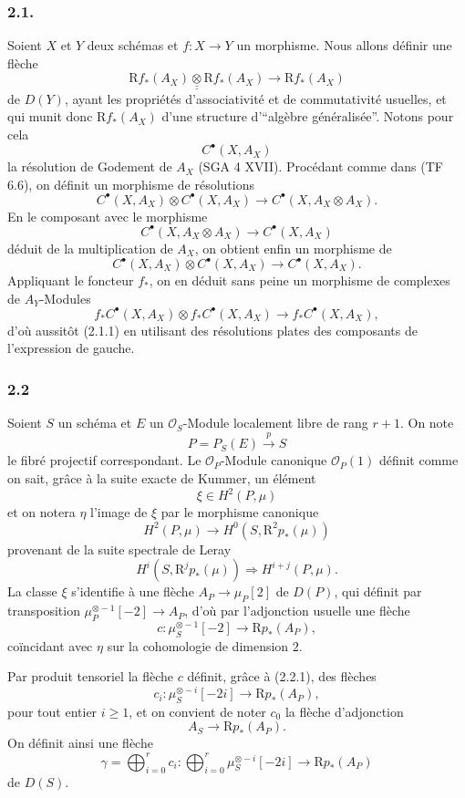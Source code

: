 \documentclass[11pt]{article}
\newcommand{\R}{\mathrm{R}}\newcommand{\RHomCore}{\mathrm{RHom}}
\providecommand{\R}{\mathrm R}
\begin{document}
\subsubsection*{2.1.}
Soient $X$ et $Y$ deux schémas et $f:X\to Y$ un morphisme. Nous allons définir une flèche
\[
\R f_*(A_X)\mathbin{\underline{\underline{\otimes}}} \R f_*(A_X)\longrightarrow \R f_*(A_X)
\tag{2.1.1}
\]
de $D(Y)$, ayant les propriétés d'associativité et de commutativité usuelles, et qui munit donc $\R f_*(A_X)$ d'une structure d'``algèbre généralisée''. Notons pour cela
\[
C^{\bullet}(X,A_X)
\]
la
résolution de Godement de $A_X$ (SGA 4 XVII). Procédant comme dans (TF 6.6), on définit un morphisme de résolutions
\[
C^{\bullet}(X,A_X)\otimes C^{\bullet}(X,A_X)\longrightarrow C^{\bullet}(X,A_X\otimes A_X).
\]
En le composant avec le morphisme
\[
C^{\bullet}(X,A_X\otimes A_X)\longrightarrow C^{\bullet}(X,A_X)
\]
déduit de la multiplication de $A_X$, on obtient enfin un morphisme de
\[
C^{\bullet}(X,A_X)\otimes C^{\bullet}(X,A_X)\longrightarrow C^{\bullet}(X,A_X).
\tag{2.1.2}
\]
Appliquant le foncteur $f_*$, on en déduit sans peine un morphisme de complexes de $A_Y$-Modules
\[
f_*C^{\bullet}(X,A_X)\otimes f_*C^{\bullet}(X,A_X)\longrightarrow f_*C^{\bullet}(X,A_X),
\]
d'où aussitôt (2.1.1) en utilisant des résolutions plates des composants de l'expression de gauche.

\subsubsection*{2.2}
Soient $S$ un schéma et $E$ un $\mathcal O_S$-Module localement libre de rang $r+1$. On note
\[
P=P_S(E)\xrightarrow{p}S
\]
le fibré projectif correspondant. Le $\mathcal O_P$-Module canonique $\mathcal O_P(1)$ définit comme on sait, grâce à la suite exacte de Kummer, un élément
\[
\xi\in H^2(P,\mu)
\]
et on notera $\eta$ l'image de $\xi$ par le morphisme canonique
\[
H^2(P,\mu)\longrightarrow H^0(S,\mathrm{R}^2p_*(\mu))
\]
provenant de la suite spectrale de Leray
\[
H^i(S,\mathrm{R}^jp_*(\mu))\Rightarrow H^{i+j}(P,\mu).
\]
La classe $\xi$ s'identifie à une flèche $A_P\to\mu_P[2]$ de $D(P)$, qui définit par transposition $\mu_P^{\otimes -1}[-2]\to A_P$, d'où par l'adjonction usuelle une flèche
\[
c:\mu_S^{\otimes -1}[-2]\longrightarrow \R p_*(A_P),
\]
coïncidant avec $\eta$ sur la cohomologie de dimension $2$.

Par
produit tensoriel la flèche $c$ définit, grâce à (2.2.1), des flèches
\[
c_i:\mu_S^{\otimes -i}[-2i]\longrightarrow \R p_*(A_P),
\]
pour tout entier $i\ge1$, et on convient de noter $c_0$ la flèche d'adjonction
\[
A_S\longrightarrow \R p_*(A_P).
\]
On définit ainsi une flèche
\[
\gamma=\bigoplus_{i=0}^{r}c_i:
\bigoplus_{i=0}^{r}\mu_S^{\otimes -i}[-2i]\longrightarrow \R p_*(A_P)
\]
de $D(S)$.
\end{document}
